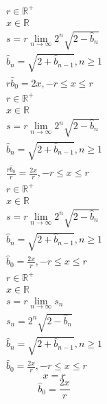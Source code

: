 \documentclass[a4paper,12pt]{report}
\begin{document}
\begin{subequations}
\begin{gather}
r \in \mathbb{R}^+ \\
x \in \mathbb{R} \\
s = r \lim \limits_{n \to \infty} 2^n \sqrt{2 - \hat{b}_n} \\
\hat{b}_n = \sqrt{2 + \hat{b}_{n-1}}, n \geq 1 \\
r \hat{b}_0 = 2x, -r \leq x \leq r
\end{gather}
\end{subequations}
\begin{subequations}
\begin{gather}
r \in \mathbb{R}^+ \\
x \in \mathbb{R} \\
s = r \lim \limits_{n \to \infty} 2^n \sqrt{2 - \hat{b}_n} \\
\hat{b}_n = \sqrt{2 + \hat{b}_{n-1}}, n \geq 1 \\
\frac{r \hat{b}_0}{r} = \frac{2x}{r}, -r \leq x \leq r
\end{gather}
\end{subequations}
\begin{subequations}
\begin{gather}
r \in \mathbb{R}^+ \\
x \in \mathbb{R} \\
s = r \lim \limits_{n \to \infty} 2^n \sqrt{2 - \hat{b}_n} \\
\hat{b}_n = \sqrt{2 + \hat{b}_{n-1}}, n \geq 1 \\
\hat{b}_0 = \frac{2x}{r}, -r \leq x \leq r
\end{gather}
\end{subequations}
\begin{subequations}
\begin{gather}
r \in \mathbb{R}^+ \\
x \in \mathbb{R} \\
s = r \lim \limits_{n \to \infty} s_n \\
s_n = 2^n \sqrt{2 - \hat{b}_n} \\
\hat{b}_n = \sqrt{2 + \hat{b}_{n-1}}, n \geq 1 \\
\hat{b}_0 = \frac{2x}{r}, -r \leq x \leq r
\end{gather}
\end{subequations}
\begin{equation}
x = r
\end{equation}
\begin{equation}
\hat{b}_0 = \frac{2x}{r}
\end{equation}
\end{document}
